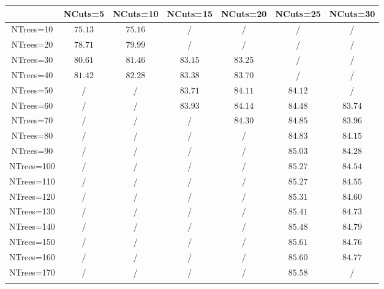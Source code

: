 \centering
\begin{tabular}{ccccccc} \toprule\toprule
 & NCuts=5 & NCuts=10 & NCuts=15 & NCuts=20 & NCuts=25 & NCuts=30\\\midrule
NTrees=10 & $75.13$ & $75.16$ &  / &  / &  / &  /\\
NTrees=20 & $78.71$ & $79.99$ &  / &  / &  / &  /\\
NTrees=30 & $80.61$ & $81.46$ & $83.15$ & $83.25$ &  / &  /\\
NTrees=40 & $81.42$ & $82.28$ & $83.38$ & $83.70$ &  / &  /\\
NTrees=50 &  / &  / & $83.71$ & $84.11$ & $84.12$ &  /\\
NTrees=60 &  / &  / & $83.93$ & $84.14$ & $84.48$ & $83.74$\\
NTrees=70 &  / &  / &  / & $84.30$ & $84.85$ & $83.96$\\
NTrees=80 &  / &  / &  / &  / & $84.83$ & $84.15$\\
NTrees=90 &  / &  / &  / &  / & $85.03$ & $84.28$\\
NTrees=100 &  / &  / &  / &  / & $85.27$ & $84.54$\\
NTrees=110 &  / &  / &  / &  / & $85.27$ & $84.55$\\
NTrees=120 &  / &  / &  / &  / & $85.31$ & $84.60$\\
NTrees=130 &  / &  / &  / &  / & $85.41$ & $84.73$\\
NTrees=140 &  / &  / &  / &  / & $85.48$ & $84.79$\\
NTrees=150 &  / &  / &  / &  / & $85.61$ & $84.76$\\
NTrees=160 &  / &  / &  / &  / & $85.60$ & $84.77$\\
NTrees=170 &  / &  / &  / &  / & $85.58$ &  /\\
\bottomrule\bottomrule\\
\end{tabular}
